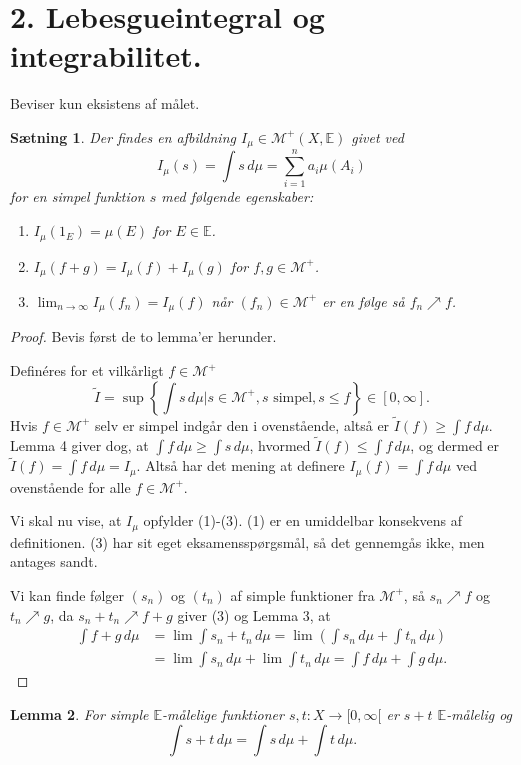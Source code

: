 \documentclass[12pt]{report}
\newtheorem{lemma}{Lemma}
\newtheorem{theorem}[lemma]{Sætning}
\theoremstyle{break}
\newtheorem*{proof}{Bevis}
\theoremstyle{break}
\newcommand{\Int}[1]{\int#1\,d\mu}
\newcommand{\EE}{\mathbb{E}}
\newcommand{\M}{\mathcal{M}^+}
\begin{document}
\section*{2. Lebesgueintegral og integrabilitet.}
Beviser kun eksistens af målet.
\begin{theorem}
Der findes en afbildning $I_\mu\in\M(X,\EE)$ givet ved
\[I_\mu(s)=\Int{s}=\sum_{i=1}^{n}a_i\mu(A_i)\] for en simpel funktion $s$ med følgende egenskaber:
\begin{enumerate}
\item $I_\mu(1_E)=\mu(E)$ for $E\in\EE$.
\item $I_\mu(f+g)=I_\mu(f)+I_\mu(g)$ for $f,g\in\M$.
\item $\lim_{n\to\infty}I_\mu(f_n)=I_\mu(f)$ når $(f_n)\in\M$ er en følge så $f_n\nearrow f$.
\end{enumerate}
\end{theorem}
\begin{proof}
Bevis først de to lemma'er herunder.

\bigskip

Definéres for et vilkårligt $f\in\M$
\[\tilde{I}=\sup\left\{\Int{s}\vert s\in\M, s\text{ simpel},s\leq f\right\}\in[0,\infty].\]
Hvis $f\in\M$ selv er simpel indgår den i ovenstående, altså er $\tilde{I}(f)\geq\Int{f}$. Lemma 4 giver dog, at $\Int{f}\geq\Int{s}$, hvormed  $\tilde{I}(f)\leq \Int{f}$, og dermed er $\tilde{I}(f)=\Int{f} = I_\mu$. Altså har det mening at definere $I_\mu(f)=\Int{f}$ ved ovenstående for alle $f\in\M$.

\bigskip

Vi skal nu vise, at $I_\mu$ opfylder (1)-(3). (1) er en umiddelbar konsekvens af definitionen. (3) har sit eget eksamensspørgsmål, så det gennemgås ikke, men antages sandt. 

\bigskip

Vi kan finde følger $(s_n)$ og $(t_n)$ af simple funktioner fra $\M$, så $s_n\nearrow f$ og $t_n\nearrow g$, da $s_n+t_n\nearrow f+g$ giver (3) og Lemma 3, at
\begin{align*}
\Int{f+g}&=\lim\Int{s_n+t_n}=\lim\left(\Int{s_n}+\Int{t_n}\right) \\ & = \lim\Int{s_n}+\lim\Int{t_n}=\Int{f}+\Int{g}.
\end{align*}
\end{proof}
\begin{lemma}
For simple $\EE$-målelige funktioner $s,t\colon X\to[0,\infty[$ er $s+t$ $\EE$-målelig og \[\Int{s+t}=\Int{s}+\Int{t}.\]
\end{lemma}
\end{document}
